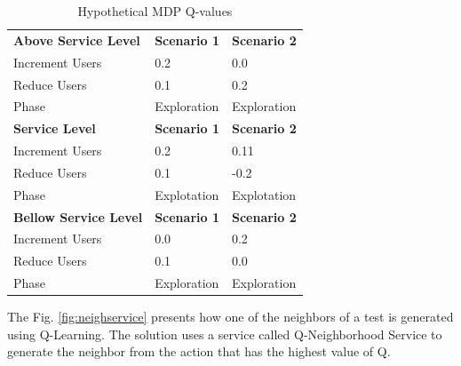 \begin{table}[]
\centering
\caption{Hypothetical MDP Q-values }
\label{pab:mdp}
\begin{tabular}{lll}
\rowcolor[HTML]{C0C0C0} 
\textbf{Above Service Level}  & \textbf{Scenario 1} & \textbf{Scenario 2} \\
Increment Users               & 0.2                 & 0.0                 \\
Reduce Users                  & 0.1                 & 0.2                 \\
Phase                         & Exploration         & Exploration         \\
\rowcolor[HTML]{C0C0C0} 
\textbf{Service Level}        & \textbf{Scenario 1} & \textbf{Scenario 2} \\
Increment Users               & 0.2                 & 0.11                \\
Reduce Users                  & 0.1                 & -0.2                \\
\rowcolor[HTML]{F8FF00} 
Phase                         & Explotation         & Explotation         \\
\rowcolor[HTML]{C0C0C0} 
\textbf{Bellow Service Level} & \textbf{Scenario 1} & \textbf{Scenario 2} \\
Increment Users               & 0.0                 & 0.2                 \\
Reduce Users                  & 0.1                 & 0.0                 \\
Phase                         & Exploration         & Exploration        
\end{tabular}
\end{table}

The Fig. \ref{fig:neighservice} presents how one of the neighbors of a test is generated using Q-Learning. The solution uses a service called Q-Neighborhood Service to generate the neighbor from the action that has the highest value of Q.


